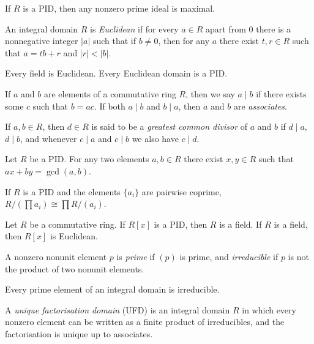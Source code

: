 \begin{prop}
    If $R$ is a PID, then any nonzero prime ideal is maximal.
\end{prop}
\begin{defn}
    An integral domain $R$ is \emph{Euclidean} if for every $a\in R$ apart from
    $0$ there is a nonnegative integer $|a|$ such that
    if $b\ne 0$, then for any $a$ there exist $t,r\in R$ such that
    $a=tb+r$ and $|r|<|b|$.
\end{defn}
\begin{prop}
    Every field is Euclidean. Every Euclidean domain is a PID\@.
\end{prop}
\begin{defn}
    If $a$ and $b$ are elements of a commutative ring $R$, then we say $a\mid b$
    if there exists some $c$ such that $b=ac$. If both $a\mid b$ and $b\mid a$,
    then $a$ and $b$ are \emph{associates}.
\end{defn}
\begin{defn}
    If $a,b\in R$, then $d\in R$ is said to be a \emph{greatest common divisor}
    of $a$ and $b$ if $d\mid a$, $d\mid b$, and whenever $c\mid a$ and $c\mid b$
    we also have $c\mid d$.
\end{defn}
\begin{prop}
    Let $R$ be a PID\@. For any two elements $a,b\in R$ there exist
    $x,y\in R$ such that $ax+by=\gcd(a,b)$.
\end{prop}
\begin{thm}
    If $R$ is a PID and the elements $\{a_i\}$ are pairwise coprime,
    $R/\left(\prod a_i\right)\cong\prod R/(a_i)$.
\end{thm}
\begin{prop}
    Let $R$ be a commutative ring. If $R[x]$ is a PID, then
    $R$ is a field. If $R$ is a field, then $R[x]$ is Euclidean.
\end{prop}
\begin{defn}
    A nonzero nonunit element $p$ is \emph{prime} if $(p)$ is prime, and
    \emph{irreducible} if $p$ is not the product of two nonunit elements.
\end{defn}
\begin{prop}
    Every prime element of an integral domain is irreducible.
\end{prop}
\begin{defn}
    A \emph{unique factorisation domain} (UFD) is an integral domain $R$ in
    which every nonzero element can be written as a finite product of
    irreducibles, and the factorisation is unique up to associates.
\end{defn}
